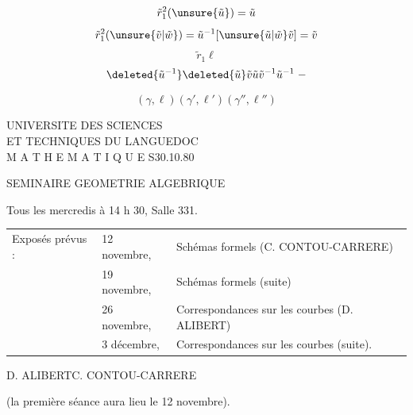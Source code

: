 \[
\tilde r_1^2(\unsure{\tilde u})=\tilde u
\]
\[
\tilde r_1^2(\unsure{\tilde v|\tilde w})=\tilde u^{-1}[\unsure{\tilde u|\tilde w}\tilde v]=\tilde v
\]
\[
\tilde r_1\ell
\]
\[
\deleted{\tilde u^{-1}}\deleted{\tilde u}\tilde v\tilde u\tilde v^{-1}\tilde u^{-1}\;-
\]

\[
(\gamma,\ell)(\gamma',\ell')(\gamma'',\ell'')
\]

UNIVERSITE DES SCIENCES\\
ET TECHNIQUES DU LANGUEDOC\\
M A T H E M A T I Q U E S\hfill 30.10.80

\begin{center}
SEMINAIRE GEOMETRIE ALGEBRIQUE
\end{center}

Tous les mercredis à 14 h 30, Salle 331.

\begin{tabular}{lll}
Exposés prévus : & 12 novembre, & Schémas formels (C. CONTOU-CARRERE)\\
& 19 novembre, & Schémas formels (suite)\\
& 26 novembre, & Correspondances sur les courbes (D. ALIBERT)\\
& 3 décembre, & Correspondances sur les courbes (suite).
\end{tabular}

\begin{flushright}
D. ALIBERT\qquad C. CONTOU-CARRERE
\end{flushright}

(la première séance aura lieu le 12 novembre).
